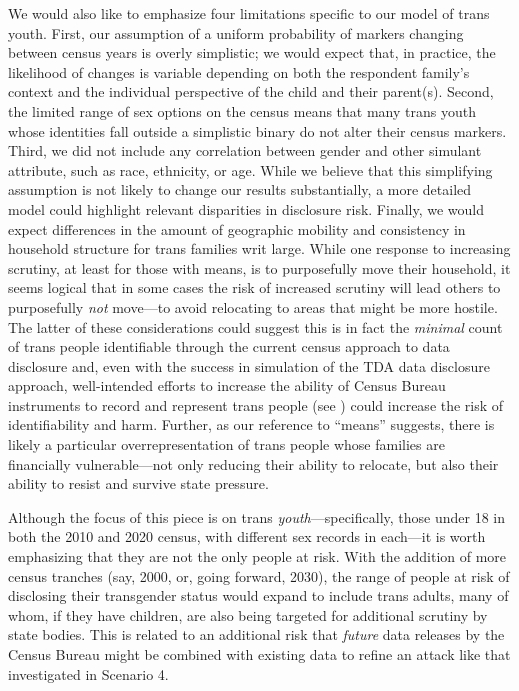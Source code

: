 \documentclass{jpc} %
\theoremstyle{plain}\newtheorem{satz}[thm]{Satz} %
\begin{document}
We would also like to emphasize four limitations specific to our model of trans youth. First, our assumption of a uniform probability of markers changing between census years is overly simplistic; we would expect that, in practice, the likelihood of changes is variable depending on both the respondent family's context and the individual perspective of the child and their parent(s). Second, the limited range of sex options on the census means that many trans youth whose identities fall outside a simplistic binary do not alter their census markers. Third, we did not include any correlation between gender and other simulant attribute, such as race, ethnicity, or age.  While we believe that this simplifying assumption is not likely to change our results substantially, a more detailed model could highlight relevant disparities in disclosure risk. Finally, we would expect differences in the amount of geographic mobility and consistency in household structure for trans families writ large. While one response to increasing scrutiny, at least for those with means, is to purposefully move their household, it seems logical that in some cases the risk of increased scrutiny will lead others to purposefully \emph{not} move---to avoid relocating to areas that might be more hostile. The latter of these considerations could  suggest this is in fact the \textit{minimal} count of trans people identifiable through the current census approach to data disclosure and, even with the success in simulation of the TDA data disclosure approach, well-intended efforts to increase the ability of Census Bureau instruments to record and represent trans people (see \cite{whfactsheet}) could  increase the risk of identifiability and harm. Further, as our reference to ``means'' suggests, there is likely a particular overrepresentation of trans people whose families are financially vulnerable---not only reducing their ability to relocate, but also their ability to resist and survive state pressure.

Although the focus of this piece is on trans \textit{youth}---specifically, those under 18 in both the 2010 and 2020 census, with different sex records in each---it is worth emphasizing that they are not the only people at risk. With the addition of more census tranches (say, 2000, or, going forward, 2030), the range of people at risk of disclosing their transgender status would expand to include trans adults, many of whom, if they have children, are also being targeted for additional scrutiny by state bodies.  This is related to an additional risk that \emph{future} data releases by the Census Bureau might be combined with existing data to refine an attack like that investigated in Scenario 4.
\end{document}
